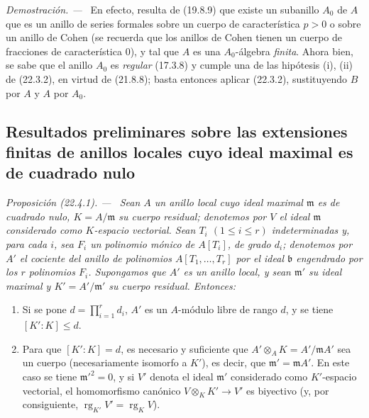 \documentclass[10pt,oneside]{book}
\makeatletter
\newcommand{\setmanualcurrentlabel}[1]{\def\@currentlabel{#1}}
\newenvironment{proposition}[1][]{%
  \setmanualcurrentlabel{#1}\par\medskip\noindent\itshape Proposición (#1). ---\ }{\par}
\newenvironment{proof}{%
  \par\medskip\noindent\textit{Demostración. ---\ }}{\par}
\makeatother
\begin{document}
\begin{proof}
En efecto, resulta de (19.8.9) que existe un subanillo $A_0$ de $A$ que es un
anillo de series formales sobre un cuerpo de característica $p>0$ o sobre un
anillo de Cohen (se recuerda que los anillos de Cohen tienen un cuerpo de
fracciones de característica $0$), y tal que $A$ es una $A_0$-álgebra \emph{finita}.
Ahora bien, se sabe que el anillo $A_0$ es \emph{regular} (17.3.8) y cumple una de las
hipótesis (i), (ii) de (22.3.2), en virtud de (21.8.8); basta entonces aplicar
(22.3.2), sustituyendo $B$ por $A$ y $A$ por $A_0$.
\end{proof}
\subsection{Resultados preliminares sobre las extensiones finitas de anillos locales cuyo ideal maximal es de cuadrado nulo}
\label{subsection:0.22.4-es}
\label{0.22.4-es}

\begin{proposition}[22.4.1]
\label{0.22.4.1-es}
Sean $A$ un anillo local cuyo ideal maximal $\mathfrak m$ es de cuadrado
nulo, $K=A/\mathfrak m$ su cuerpo residual; denotemos por $V$ el ideal
$\mathfrak m$ considerado como $K$-espacio vectorial. Sean $T_i$
$(1\leqslant i\leqslant r)$ indeterminadas y, para cada $i$, sea
$F_i$ un polinomio mónico de $A[T_i]$, de grado $d_i$; denotemos por $A'$ el
cociente del anillo de polinomios $A[T_1,\ldots,T_r]$ por el ideal
$\mathfrak b$ engendrado por los $r$ polinomios $F_i$. Supongamos que $A'$ es
un anillo local, y sean $\mathfrak m'$ su ideal maximal y
$K'=A'/\mathfrak m'$ su cuerpo residual. Entonces:
\begin{enumerate}
  \item[\textup{(i)}] Si se pone $d=\prod_{i=1}^r d_i$, $A'$ es un $A$-módulo
  libre de rango $d$, y se tiene $[K':K]\leqslant d$.
  \item[\textup{(ii)}] Para que $[K':K]=d$, es necesario y suficiente que
  $A'\otimes_AK=A'/\mathfrak mA'$ sea un cuerpo (necesariamente isomorfo a
  $K'$), es decir, que $\mathfrak m'=\mathfrak mA'$. En este caso se tiene
  $\mathfrak m'^2=0$, y si $V'$ denota el ideal $\mathfrak m'$ considerado
  como $K'$-espacio vectorial, el homomorfismo canónico
  $V\otimes_KK'\to V'$ es biyectivo (y, por consiguiente,
  $\operatorname{rg}_{K'}V'=\operatorname{rg}_K V$).
\end{enumerate}
\end{proposition}
\end{document}
